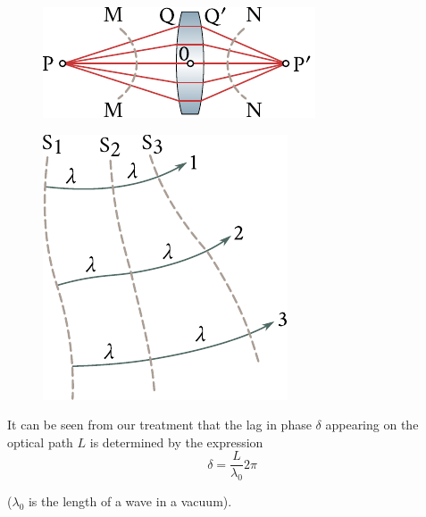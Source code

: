\begin{figure}[t]
	\begin{minipage}[t]{0.48\linewidth}
		\begin{center}
			\includegraphics[scale=1]{figures/ch_16/fig_16_10.pdf}
			\caption[]{}
			\label{fig:16_10}
		\end{center}
	\end{minipage}
	\hfill{ }%
	\begin{minipage}[t]{0.48\linewidth}
		\begin{center}
			\includegraphics[scale=1]{figures/ch_16/fig_16_11.pdf}
            \caption[]{}
			\label{fig:16_11}
		\end{center}
	\end{minipage}
\vspace{-0.4cm}
\end{figure}

It can be seen from our treatment that the lag in phase $\delta$ appearing on the optical path $L$ is determined by the expression
\begin{equation}\label{eq:16_55}
    \delta = \frac{L}{\lambda_0} 2\pi
\end{equation}

\noindent
($\lambda_0$ is the length of a wave in a vacuum).

